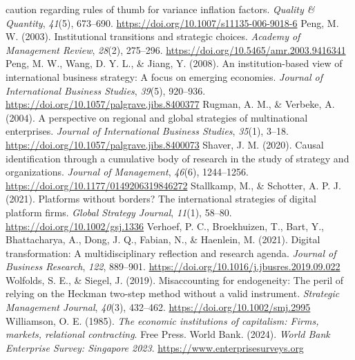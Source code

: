 \documentclass[12pt,a4paper]{article}
\begin{document}
caution regarding rules of thumb for variance inflation factors.
\emph{Quality \& Quantity}, \emph{41}(5), 673--690.
\url{https://doi.org/10.1007/s11135-006-9018-6} Peng, M. W. (2003).
Institutional transitions and strategic choices. \emph{Academy of
Management Review}, \emph{28}(2), 275--296.
\url{https://doi.org/10.5465/amr.2003.9416341} Peng, M. W., Wang, D. Y.
L., \& Jiang, Y. (2008). An institution-based view of international
business strategy: A focus on emerging economies. \emph{Journal of
International Business Studies}, \emph{39}(5), 920--936.
\url{https://doi.org/10.1057/palgrave.jibs.8400377} Rugman, A. M., \&
Verbeke, A. (2004). A perspective on regional and global strategies of
multinational enterprises. \emph{Journal of International Business
Studies}, \emph{35}(1), 3--18.
\url{https://doi.org/10.1057/palgrave.jibs.8400073} Shaver, J. M.
(2020). Causal identification through a cumulative body of research in
the study of strategy and organizations. \emph{Journal of Management},
\emph{46}(6), 1244--1256. \url{https://doi.org/10.1177/0149206319846272}
Stallkamp, M., \& Schotter, A. P. J. (2021). Platforms without borders?
The international strategies of digital platform firms. \emph{Global
Strategy Journal}, \emph{11}(1), 58--80.
\url{https://doi.org/10.1002/gsj.1336} Verhoef, P. C., Broekhuizen, T.,
Bart, Y., Bhattacharya, A., Dong, J. Q., Fabian, N., \& Haenlein, M.
(2021). Digital transformation: A multidisciplinary reflection and
research agenda. \emph{Journal of Business Research}, \emph{122},
889--901. \url{https://doi.org/10.1016/j.jbusres.2019.09.022} Wolfolds,
S. E., \& Siegel, J. (2019). Misaccounting for endogeneity: The peril of
relying on the Heckman two-step method without a valid instrument.
\emph{Strategic Management Journal}, \emph{40}(3), 432--462.
\url{https://doi.org/10.1002/smj.2995} Williamson, O. E. (1985).
\emph{The economic institutions of capitalism: Firms, markets,
relational contracting}. Free Press. World Bank. (2024). \emph{World
Bank Enterprise Survey: Singapore 2023}.
\url{https://www.enterprisesurveys.org}
\end{document}
